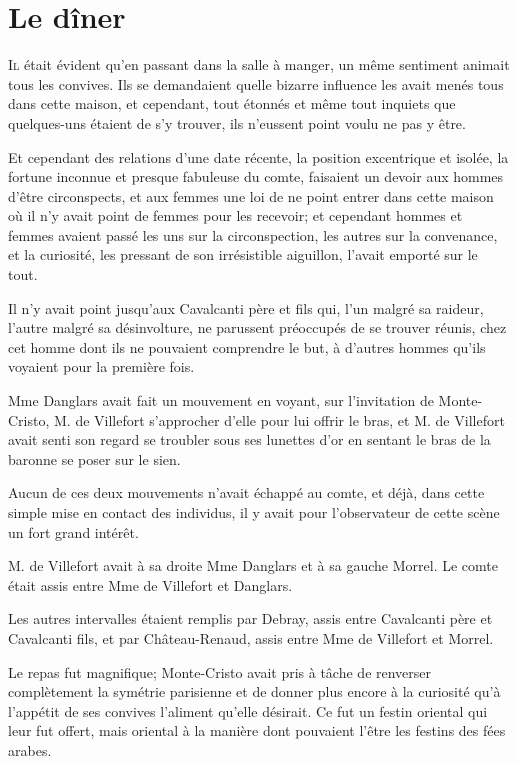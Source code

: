 \chapter{Le dîner}

\lettrine{I}{l} était évident qu'en passant dans la salle à manger, un même sentiment animait tous les convives. Ils se demandaient quelle bizarre influence les avait menés tous dans cette maison, et cependant, tout étonnés et même tout inquiets que quelques-uns étaient de s'y trouver, ils n'eussent point voulu ne pas y être. 

Et cependant des relations d'une date récente, la position excentrique et isolée, la fortune inconnue et presque fabuleuse du comte, faisaient un devoir aux hommes d'être circonspects, et aux femmes une loi de ne point entrer dans cette maison où il n'y avait point de femmes pour les recevoir; et cependant hommes et femmes avaient passé les uns sur la circonspection, les autres sur la convenance, et la curiosité, les pressant de son irrésistible aiguillon, l'avait emporté sur le tout. 

Il n'y avait point jusqu'aux Cavalcanti père et fils qui, l'un malgré sa raideur, l'autre malgré sa désinvolture, ne parussent préoccupés de se trouver réunis, chez cet homme dont ils ne pouvaient comprendre le but, à d'autres hommes qu'ils voyaient pour la première fois.  

Mme Danglars avait fait un mouvement en voyant, sur l'invitation de Monte-Cristo, M. de Villefort s'approcher d'elle pour lui offrir le bras, et M. de Villefort avait senti son regard se troubler sous ses lunettes d'or en sentant le bras de la baronne se poser sur le sien. 

Aucun de ces deux mouvements n'avait échappé au comte, et déjà, dans cette simple mise en contact des individus, il y avait pour l'observateur de cette scène un fort grand intérêt. 

M. de Villefort avait à sa droite Mme Danglars et à sa gauche Morrel. Le comte était assis entre Mme de Villefort et Danglars. 

Les autres intervalles étaient remplis par Debray, assis entre Cavalcanti père et Cavalcanti fils, et par Château-Renaud, assis entre Mme de Villefort et Morrel. 

Le repas fut magnifique; Monte-Cristo avait pris à tâche de renverser complètement la symétrie parisienne et de donner plus encore à la curiosité qu'à l'appétit de ses convives l'aliment qu'elle désirait. Ce fut un festin oriental qui leur fut offert, mais oriental à la manière dont pouvaient l'être les festins des fées arabes. 


